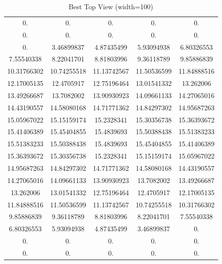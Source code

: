 \documentclass[12pt]{article}
\begin{document}
\begin{table}
    \caption{Best Top View (width=100)}
    \centering
    \begin{tabular}{ccccc}
        \hline
        0.          & 0.          & 0.          & 0.          & 0.          \\
        0.          & 0.          & 0.          & 0.          & 0.          \\
        0.          & 3.46899837  & 4.87435499  & 5.93094938  & 6.80326553  \\
        7.55540338  & 8.22041701  & 8.81803996  & 9.36118789  & 9.85886839  \\
        10.31766302 & 10.74255518 & 11.13742567 & 11.50536599 & 11.84888516 \\
        12.17005135 & 12.4705917  & 12.75196464 & 13.01541332 & 13.262006   \\
        13.49266687 & 13.7082002  & 13.90930923 & 14.09661133 & 14.27065016 \\
        14.43190557 & 14.58080168 & 14.71771362 & 14.84297302 & 14.95687263 \\
        15.05967022 & 15.15159174 & 15.2328341  & 15.30356738 & 15.36393672 \\
        15.41406389 & 15.45404855 & 15.4839693  & 15.50388438 & 15.51383233 \\
        15.51383233 & 15.50388438 & 15.4839693  & 15.45404855 & 15.41406389 \\
        15.36393672 & 15.30356738 & 15.2328341  & 15.15159174 & 15.05967022 \\
        14.95687263 & 14.84297302 & 14.71771362 & 14.58080168 & 14.43190557 \\
        14.27065016 & 14.09661133 & 13.90930923 & 13.7082002  & 13.49266687 \\
        13.262006   & 13.01541332 & 12.75196464 & 12.4705917  & 12.17005135 \\
        11.84888516 & 11.50536599 & 11.13742567 & 10.74255518 & 10.31766302 \\
        9.85886839  & 9.36118789  & 8.81803996  & 8.22041701  & 7.55540338  \\
        6.80326553  & 5.93094938  & 4.87435499  & 3.46899837  & 0.          \\
        0.          & 0.          & 0.          & 0.          & 0.          \\
        0.          & 0.          & 0.          & 0.          & 0.          \\
        \hline
    \end{tabular}
    \label{tab:best_top_view}
\end{table}
\end{document}
